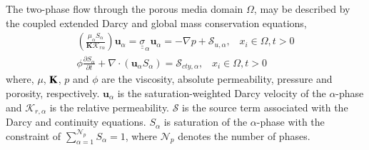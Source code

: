 \documentclass[preprint,authoryear,12pt]{elsarticle}
\begin{document}

\medskip
The two-phase flow through the porous media domain $\Omega$, may be described by the coupled extended Darcy and global mass conservation equations,
\begin{eqnarray}
\left(\displaystyle\frac{\mu_{\alpha}S_{\alpha}}{{\mathbf K}\mathcal{K}_{r\alpha}}\right) {\mathbf u}_{\alpha} = \underline{\underline{\sigma}}_{\alpha} {\mathbf u}_{\alpha} = -\nabla p + \mathcal{S}_{u,\alpha},\;\;\; x_{i}\in\Omega, t>0 \label{eqn:darcy_eqn} \\
\phi\displaystyle\frac{\partial S_{\alpha} }{\partial t} +   \nabla \cdot \left( {\mathbf u}_{\alpha}  S_{\alpha}\right) =  \mathcal{S}_{cty,\alpha},\;\;\; x_{i}\in\Omega, t>0\label{eqn:saturation_eqn}
\end{eqnarray}
where, $\mu$, ${\bf K}$, $p$ and $\phi$ are the viscosity, absolute permeability, pressure and porosity, respectively. ${\mathbf u}_{\alpha}$ is the saturation-weighted Darcy velocity of the $\alpha$-phase and $\mathcal{K}_{r,\alpha}$ is the relative permeability. $\mathcal{S}$ is the source term associated with the Darcy and continuity equations. $S_{\alpha}$ is saturation of the $\alpha$-phase with the constraint of $\sum\limits_{\alpha=1}^{\mathcal{N}_{p}} S_{\alpha} = 1$, where $\mathcal{N}_{p}$ denotes the number of phases.

\end{document}
